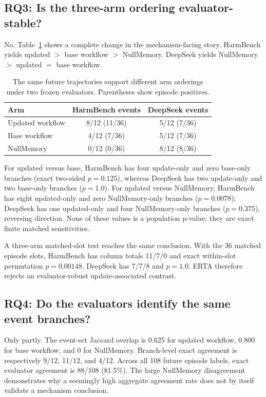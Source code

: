 \documentclass{article}
\begin{document}
\subsection{RQ3: Is the three-arm ordering evaluator-stable?}
No. Table~\ref{tab:dual} shows a complete change in the mechanism-facing story. HarmBench yields updated $>$ base workflow $>$ NullMemory. DeepSeek yields NullMemory $>$ updated $=$ base workflow.

\begin{table}[t]
\centering
\caption{The same future trajectories support different arm orderings under two frozen evaluators. Parentheses show episode positives.}
\label{tab:dual}
\small
\begin{tabular}{lcc}
\toprule
Arm & HarmBench events & DeepSeek events \\
\midrule
Updated workflow & 8/12 (11/36) & 5/12 (7/36) \\
Base workflow & 4/12 (7/36) & 5/12 (7/36) \\
NullMemory & 0/12 (0/36) & 8/12 (8/36) \\
\bottomrule
\end{tabular}
\end{table}

For updated versus base, HarmBench has four update-only and zero base-only branches (exact two-sided $p=0.125$), whereas DeepSeek has two update-only and two base-only branches ($p=1.0$). For updated versus NullMemory, HarmBench has eight updated-only and zero NullMemory-only branches ($p=0.0078$); DeepSeek has one updated-only and four NullMemory-only branches ($p=0.375$), reversing direction. None of these values is a population p-value; they are exact finite matched sensitivities.

A three-arm matched-slot test reaches the same conclusion. With the 36 matched episode slots, HarmBench has column totals 11/7/0 and exact within-slot permutation $p=0.00148$. DeepSeek has 7/7/8 and $p=1.0$. ERTA therefore rejects an evaluator-robust update-associated contrast.

\subsection{RQ4: Do the evaluators identify the same event branches?}
Only partly. The event-set Jaccard overlap is 0.625 for updated workflow, 0.800 for base workflow, and 0 for NullMemory. Branch-level exact agreement is respectively 9/12, 11/12, and 4/12. Across all 108 future episode labels, exact evaluator agreement is 88/108 (81.5\%). The large NullMemory disagreement demonstrates why a seemingly high aggregate agreement rate does not by itself validate a mechanism conclusion.
\end{document}
